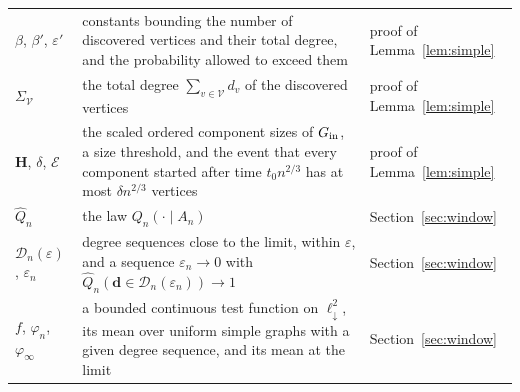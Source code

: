 \documentclass[11pt]{amsart}
\theoremstyle{remark}
\numberwithin{equation}{section}
\newcommand{\ldown}{\ell^2_{\downarrow}}
\begin{document}
{\begin{longtable}{@{}lp{}l@{}}
$\beta$, $\beta'$, $\varepsilon'$ & constants bounding the number of discovered vertices and their total degree, and the probability allowed to exceed them & proof of Lemma~\ref{lem:simple} \\
$\Sigma_{\mathcal V}$ & the total degree $\sum_{v\in\mathcal V}d_v$ of the discovered vertices & proof of Lemma~\ref{lem:simple} \\
$\boldsymbol H$, $\delta$, $\mathcal E$ & the scaled ordered component sizes of $G_{\rm in}$, a size threshold, and the event that every component started after time $t_0n^{2/3}$ has at most $\delta n^{2/3}$ vertices & proof of Lemma~\ref{lem:simple} \\
$\widehat Q_n$ & the law $Q_n(\cdot\mid A_n)$ & Section~\ref{sec:window} \\
$\mathcal D_n(\varepsilon)$, $\varepsilon_n$ & degree sequences close to the limit, within $\varepsilon$, and a sequence $\varepsilon_n\to0$ with $\widehat Q_n(\boldsymbol d\in\mathcal D_n(\varepsilon_n))\to1$ & Section~\ref{sec:window} \\
$f$, $\varphi_n$, $\varphi_\infty$ & a bounded continuous test function on $\ldown$, its mean over uniform simple graphs with a given degree sequence, and its mean at the limit & Section~\ref{sec:window} \\
\bottomrule\end{longtable}}
\end{document}
